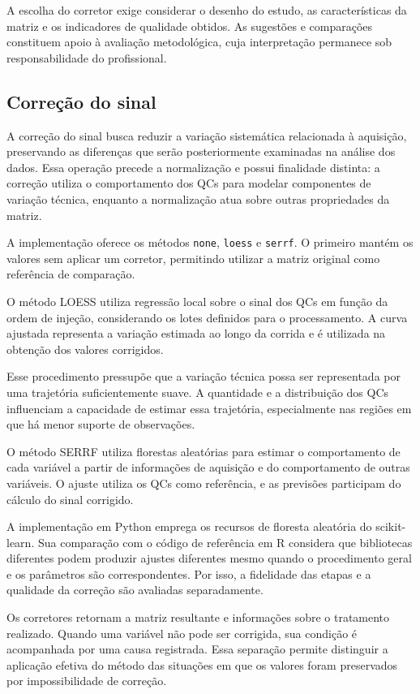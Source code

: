 A escolha do corretor exige considerar o desenho do estudo, as características da matriz e os indicadores de qualidade obtidos. As sugestões e comparações constituem apoio à avaliação metodológica, cuja interpretação permanece sob responsabilidade do profissional.

\subsection{Correção do sinal}
\label{subsec:correcao-sinal}

A correção do sinal busca reduzir a variação sistemática relacionada à aquisição, preservando as diferenças que serão posteriormente examinadas na análise dos dados. Essa operação precede a normalização e possui finalidade distinta: a correção utiliza o comportamento dos QCs para modelar componentes de variação técnica, enquanto a normalização atua sobre outras propriedades da matriz.

A implementação oferece os métodos \texttt{none}, \texttt{loess} e \texttt{serrf}. O primeiro mantém os valores sem aplicar um corretor, permitindo utilizar a matriz original como referência de comparação.

O método LOESS utiliza regressão local sobre o sinal dos QCs em função da ordem de injeção, considerando os lotes definidos para o processamento. A curva ajustada representa a variação estimada ao longo da corrida e é utilizada na obtenção dos valores corrigidos.

Esse procedimento pressupõe que a variação técnica possa ser representada por uma trajetória suficientemente suave. A quantidade e a distribuição dos QCs influenciam a capacidade de estimar essa trajetória, especialmente nas regiões em que há menor suporte de observações.

O método SERRF utiliza florestas aleatórias para estimar o comportamento de cada variável a partir de informações de aquisição e do comportamento de outras variáveis. O ajuste utiliza os QCs como referência, e as previsões participam do cálculo do sinal corrigido.

A implementação em Python emprega os recursos de floresta aleatória do scikit-learn. Sua comparação com o código de referência em R considera que bibliotecas diferentes podem produzir ajustes diferentes mesmo quando o procedimento geral e os parâmetros são correspondentes. Por isso, a fidelidade das etapas e a qualidade da correção são avaliadas separadamente.

Os corretores retornam a matriz resultante e informações sobre o tratamento realizado. Quando uma variável não pode ser corrigida, sua condição é acompanhada por uma causa registrada. Essa separação permite distinguir a aplicação efetiva do método das situações em que os valores foram preservados por impossibilidade de correção.

